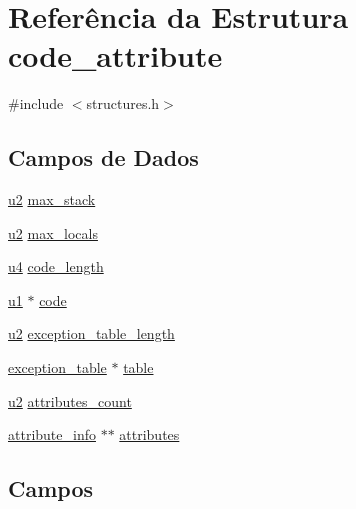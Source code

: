 \hypertarget{structcode__attribute}{}\section{Referência da Estrutura code\+\_\+attribute}
\label{structcode__attribute}


{\ttfamily \#include $<$structures.\+h$>$}

\subsection*{Campos de Dados}
\begin{DoxyCompactItemize}
\item 
\hyperlink{lista__operandos_8h_a732cde1300aafb73b0ea6c2558a7a54f}{u2} \hyperlink{structcode__attribute_abd4d398c165a4e91f3ea559808931473}{max\+\_\+stack}
\item 
\hyperlink{lista__operandos_8h_a732cde1300aafb73b0ea6c2558a7a54f}{u2} \hyperlink{structcode__attribute_ab75487f3c1d38f9fb6ad5e71ab99dea2}{max\+\_\+locals}
\item 
\hyperlink{lista__operandos_8h_ae5be1f726785414dd1b77d60df074c9d}{u4} \hyperlink{structcode__attribute_a8c2176f2e2a92747fd2920fde5992b43}{code\+\_\+length}
\item 
\hyperlink{lista__operandos_8h_ad9f4cdb6757615aae2fad89dab3c5470}{u1} $\ast$ \hyperlink{structcode__attribute_a72ecf2f84184325965481ecbc8d997cd}{code}
\item 
\hyperlink{lista__operandos_8h_a732cde1300aafb73b0ea6c2558a7a54f}{u2} \hyperlink{structcode__attribute_ab84a776a1bdeb79fde3b47279d8e12e4}{exception\+\_\+table\+\_\+length}
\item 
\hyperlink{structexception__table}{exception\+\_\+table} $\ast$ \hyperlink{structcode__attribute_a8bdff0149755249696a5d6aa288d7a98}{table}
\item 
\hyperlink{lista__operandos_8h_a732cde1300aafb73b0ea6c2558a7a54f}{u2} \hyperlink{structcode__attribute_a7c0a342c05fa196324b0806f6704916b}{attributes\+\_\+count}
\item 
\hyperlink{structattribute__info}{attribute\+\_\+info} $\ast$$\ast$ \hyperlink{structcode__attribute_a6e986c701d34b14f33959e35606b46ed}{attributes}
\end{DoxyCompactItemize}


\subsection{Campos}
\mbox{\label{structcode__attribute_a6e986c701d34b14f33959e35606b46ed}} 
